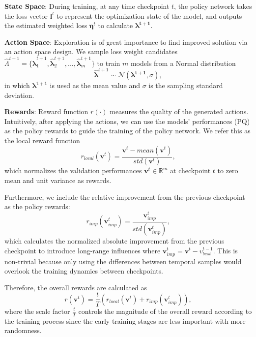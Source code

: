 \documentclass[letterpaper]{article} \usepackage{aaai21}  \usepackage{times}  \usepackage{helvet} \usepackage{courier}  \usepackage[hyphens]{url}  \usepackage{graphicx} \urlstyle{rm} \def\UrlFont{\rm}  \usepackage{natbib}  \usepackage{caption} \frenchspacing  \setlength{\pdfpagewidth}{8.5in}  \setlength{\pdfpageheight}{11in}
\begin{document}
 \textbf{State Space}: 
 During training, at any time checkpoint $t$,
 the policy network takes the loss vector $\boldsymbol{l}^t$ to represent the optimization state of the model,
 and outputs the estimated weighted loss 
 $\boldsymbol{\eta}^t$ to calculate $\boldsymbol{\lambda^{t+1}}$. 
 
 \textbf{Action Space}: Exploration is of great importance to find improved solution via an 
 action space design. We sample loss weight candidates 
 $\hat\Lambda^{t+1}=\{\boldsymbol{\hat\lambda}^{t+1}_1,\boldsymbol{\hat\lambda}^{t+1}_2,...,
 \boldsymbol{\hat\lambda}^{t+1}_m\}$ to train $m$ models
 from a Normal distribution 
 \begin{equation}\boldsymbol{\hat\lambda}^{t+1}\sim\mathcal{N}(\boldsymbol{\lambda^{t+1}},\sigma),\label{eq:sample}\end{equation}
 in which $\boldsymbol{\lambda^{t+1}}$ is uesd as the mean value and 
 $\sigma$ is the sampling standard deviation.


 \textbf{Rewards}: Reward function $r(\cdot)$ measures the quality of the generated actions. 
 Intuitively, after applying the actions, we can use the models' performances (PQ) as the 
 policy rewards to guide the training of the policy network. We refer this as the local reward function
 \begin{equation}r_{local}(\boldsymbol{v}^t)=\frac{\boldsymbol{v}^t-mean(\boldsymbol{v}^t)}{std(\boldsymbol{v}^t)},\end{equation}
 which normalizes
 the validation performances $\boldsymbol{v}^t\in \mathbb{R}^m$ at checkpoint $t$ 
 to zero mean and unit variance as rewards.
 
 Furthermore, we include the relative improvement from the previous checkpoint as the policy rewards:
 \begin{equation}r_{imp}(\boldsymbol{v}^t_{imp})=\frac{\boldsymbol{v}^{t}_{imp}}{std(\boldsymbol{v}^t_{imp})},\end{equation}
 which calculates the normalized absolute improvement from the previous checkpoint to introduce long-range influences
 where $\boldsymbol{v}^t_{imp} = \boldsymbol{v}^t-v^{t-1}_{best}.$
 This is non-trivial because only using the differences between temporal samples would
  overlook the training dynamics between checkpoints.


 Therefore, the overall rewards are calculated as  
 \begin{equation}r(\boldsymbol{v}^t)=\frac{t}{T}(r_{local}(\boldsymbol{v}^t)
  +r_{imp}(\boldsymbol{v}^t_{imp})),\label{eq:reward}\end{equation}
where the scale factor $\frac{t}{T}$ controls the magnitude of the 
 overall reward according to the training process 
 since the early training stages are less important with more randomness.
\end{document}
